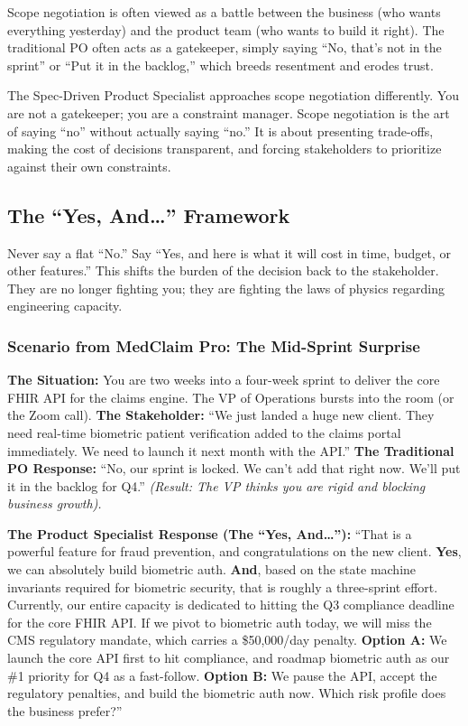 Scope negotiation is often viewed as a battle between the business (who
wants everything yesterday) and the product team (who wants to build it
right). The traditional PO often acts as a gatekeeper, simply saying
``No, that's not in the sprint'' or ``Put it in the backlog,'' which
breeds resentment and erodes trust.

The Spec-Driven Product Specialist approaches scope negotiation
differently. You are not a gatekeeper; you are a constraint manager.
Scope negotiation is the art of saying ``no'' without actually saying
``no.'' It is about presenting trade-offs, making the cost of decisions
transparent, and forcing stakeholders to prioritize against their own
constraints.

\subsection{\texorpdfstring{The ``Yes, And\ldots{}''
Framework}{The ``Yes, And\ldots'' Framework}}\label{the-yes-and-framework}

Never say a flat ``No.'' Say ``Yes, and here is what it will cost in
time, budget, or other features.'' This shifts the burden of the
decision back to the stakeholder. They are no longer fighting you; they
are fighting the laws of physics regarding engineering capacity.

\subsubsection{Scenario from MedClaim Pro: The Mid-Sprint
Surprise}\label{scenario-from-medclaim-pro-the-mid-sprint-surprise}

\textbf{The Situation:} You are two weeks into a four-week sprint to
deliver the core FHIR API for the claims engine. The VP of Operations
bursts into the room (or the Zoom call). \textbf{The Stakeholder:} ``We
just landed a huge new client. They need real-time biometric patient
verification added to the claims portal immediately. We need to launch
it next month with the API.'' \textbf{The Traditional PO Response:}
``No, our sprint is locked. We can't add that right now. We'll put it in
the backlog for Q4.'' \emph{(Result: The VP thinks you are rigid and
blocking business growth).}

\textbf{The Product Specialist Response (The ``Yes, And\ldots{}''):}
``That is a powerful feature for fraud prevention, and congratulations
on the new client. \textbf{Yes}, we can absolutely build biometric auth.
\textbf{And}, based on the state machine invariants required for
biometric security, that is roughly a three-sprint effort. Currently,
our entire capacity is dedicated to hitting the Q3 compliance deadline
for the core FHIR API. If we pivot to biometric auth today, we will miss
the CMS regulatory mandate, which carries a \$50,000/day penalty.
\textbf{Option A:} We launch the core API first to hit compliance, and
roadmap biometric auth as our \#1 priority for Q4 as a fast-follow.
\textbf{Option B:} We pause the API, accept the regulatory penalties,
and build the biometric auth now. Which risk profile does the business
prefer?''

